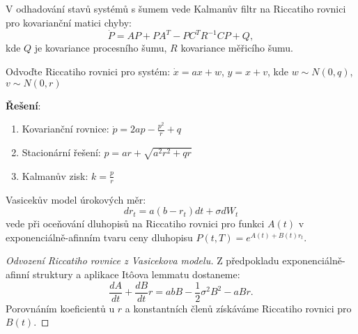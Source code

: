 \vspace{0.8\baselineskip}

\begin{application}
\label{app:kalman-filter}
V odhadování stavů systémů s šumem vede Kalmanův filtr na Riccatiho rovnici pro kovarianční matici chyby:
\[
\dot{P} = A P + P A^T - P C^T R^{-1} C P + Q,
\]
kde $Q$ je kovariance procesního šumu, $R$ kovariance měřicího šumu.
\end{application}

\vspace{0.6\baselineskip}

\begin{example}
\label{ex:kalman-skalarni}
Odvoďte Riccatiho rovnici pro systém: $\dot{x} = a x + w$, $y = x + v$, kde $w \sim N(0,q)$, $v \sim N(0,r)$

\textbf{Řešení}:
\begin{enumerate}
\item Kovarianční rovnice: $\dot{p} = 2a p - \frac{p^2}{r} + q$
\item Stacionární řešení: $p = a r + \sqrt{a^2 r^2 + q r}$
\item Kalmanův zisk: $k = \frac{p}{r}$
\end{enumerate}
\end{example}

\vspace{0.8\baselineskip}

\begin{application}
\label{app:vasicek-model}
Vasicekův model úrokových měr:
\[
dr_t = a(b - r_t)dt + \sigma dW_t
\]
vede při oceňování dluhopisů na Riccatiho rovnici pro funkci $A(t)$ v exponenciálně-afinním tvaru ceny dluhopisu $P(t,T) = e^{A(t) + B(t)r_t}$.
\end{application}

\vspace{0.6\baselineskip}

\begin{proof}[Odvození Riccatiho rovnice z Vasicekova modelu]
Z předpokladu exponenciálně-afinní struktury a aplikace Itôova lemmatu dostaneme:
\[
\frac{dA}{dt} + \frac{dB}{dt} r = a b B - \frac{1}{2} \sigma^2 B^2 - a B r.
\]
Porovnáním koeficientů u $r$ a konstantních členů získáváme Riccatiho rovnici pro $B(t)$.
\end{proof}

\vspace{0.6\baselineskip}

